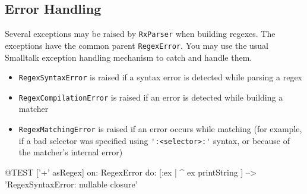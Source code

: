 \documentclass[10pt,twoside,chapterprefix=false]{scrbook}
\renewcommand{\ct}{\lstinline[mathescape=false,basicstyle={\sffamily\upshape}]}
\begin{document}
{%
\subsection{Error Handling}

Several exceptions may be raised by \ct{RxParser} when building regexes.  The exceptions have the common parent \ct{RegexError}.  You may use the usual Smalltalk exception handling mechanism to catch and handle them.

\begin{itemize}

\item \ct{RegexSyntaxError} is raised if a syntax error is detected while parsing a regex

\item \ct{RegexCompilationError} is raised if an error is detected while building a matcher

\item \ct{RegexMatchingError} is raised if an error occurs while matching (for example, if a bad selector was specified using \ct{':<selector>:'} syntax, or because of the matcher's internal error)



\end{itemize}


\begin{ToSh-code}{@TEST}
['+' asRegex] on: RegexError do: [:ex | ^ ex printString ]                                        --> 'RegexSyntaxError:  nullable closure'
\end{ToSh-code}
}
\end{document}
